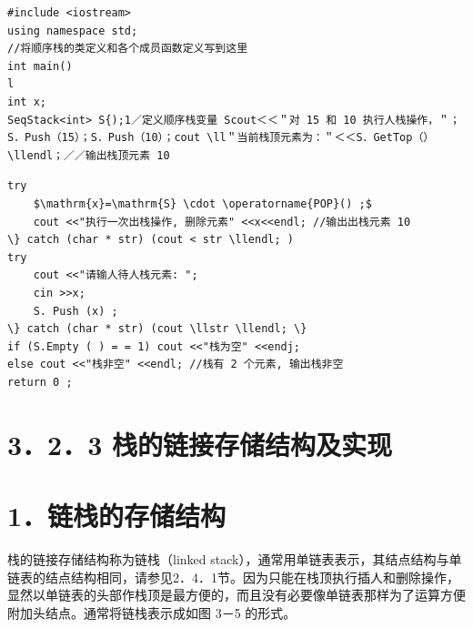 \documentclass[10pt]{article}
\begin{document}
\begin{verbatim}
#include <iostream>
using namespace std;
//将顺序栈的类定义和各个成员函数定义写到这里
int main()
l
int x;
SeqStack<int> S{);1／定义顺序栈变量 Scout＜＜＂对 15 和 10 执行人栈操作，＂；S．Push（15）；S．Push（10）；cout \ll＂当前栈顶元素为：＂＜＜S．GetTop（）\llendl；／／输出栈顶元素 10
\end{verbatim}

\begin{verbatim}
try
    $\mathrm{x}=\mathrm{S} \cdot \operatorname{POP}() ;$
    cout <<"执行一次出栈操作, 删除元素" <<x<<endl; //输出出栈元素 10
\} catch (char * str) (cout < str \llendl; )
try
    cout <<"请输人待人栈元素: ";
    cin >>x;
    S. Push (x) ;
\} catch (char * str) (cout \llstr \llendl; \}
if (S.Empty ( ) = = 1) cout <<"栈为空" <<endj;
else cout <<"栈非空" <<endl; //栈有 2 个元素, 输出栈非空
return 0 ;
\end{verbatim}

\section*{3．2．3 栈的链接存储结构及实现}
\section*{1．链栈的存储结构}
栈的链接存储结构称为链栈（linked stack），通常用单链表表示，其结点结构与单链表的结点结构相同，请参见2．4．1节。因为只能在栈顶执行插人和删除操作，显然以单链表的头部作栈顶是最方便的，而且没有必要像单链表那样为了运算方便附加头结点。通常将链栈表示成如图 3－5 的形式。
\end{document}
